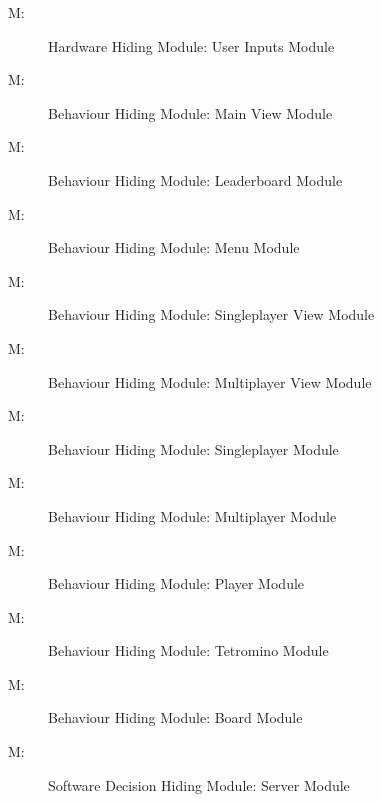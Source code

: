 \documentclass[12pt, titlepage]{article}
\newcounter{mnum}
\newcommand{\mthemnum}{M\themnum}
\begin{document}
\begin{description}
\item [ \mthemnum \label{mBHH}:] Hardware Hiding Module: User Inputs Module
\item [ \mthemnum \label{mBH}:] Behaviour Hiding Module: Main View Module
\item [ \mthemnum \label{mBH1}:] Behaviour Hiding Module: Leaderboard Module
\item [ \mthemnum \label{mBH2}:] Behaviour Hiding Module: Menu Module
\item [ \mthemnum \label{mBH3}:] Behaviour Hiding Module: Singleplayer View Module
\item [ \mthemnum \label{mBH4}:] Behaviour Hiding Module: Multiplayer View Module
\item [ \mthemnum \label{mBH5}:] Behaviour Hiding Module: Singleplayer Module
\item [ \mthemnum \label{mBH6}:] Behaviour Hiding Module: Multiplayer Module
\item [ \mthemnum \label{mBH7}:] Behaviour Hiding Module: Player Module
\item [ \mthemnum \label{mBH8}:] Behaviour Hiding Module: Tetromino Module
\item [ \mthemnum \label{mBH9}:] Behaviour Hiding Module: Board Module
\item [ \mthemnum \label{mSDH}:] Software Decision Hiding Module: Server Module
\end{description}
\end{document}
